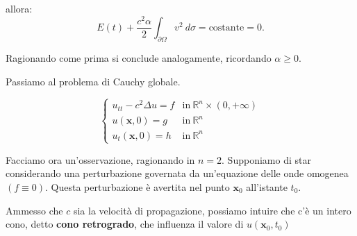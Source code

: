 \documentclass[10pt,a4paper,twoside,openright]{book}
\newcommand{\x}{\mathbf{x}}
\begin{document}
\begin{dimostrazione}
\begin{itemize}
		      allora:
		      \begin{equation*}
		      	E( t) +\frac{c^{2} \alpha }{2}\int _{\partial \Omega } v^{2} \ d\sigma =\text{costante} =0.
		      \end{equation*}
		      
		      Ragionando come prima si conclude analogamente, ricordando $\alpha \geqslant 0$.
	\end{itemize}
\end{dimostrazione}


Passiamo al problema di Cauchy globale.

\begin{equation}
	\begin{cases}
		u_{tt} -c^{2} \Delta u=f & \text{in} \ \mathbb{R}^{n} \times ( 0,+\infty ) \\
		u(\x ,0) =g      & \text{in} \ \mathbb{R}^{n}                      \\
		u_{t}(\x ,0) =h  & \text{in} \ \mathbb{R}^{n}                      
	\end{cases}
	\label{eq:pcg-onde-unicita}
\end{equation}

Facciamo ora un'osservazione, ragionando in $n=2$. Supponiamo di star considerando una perturbazione governata da un'equazione delle onde omogenea $( f\equiv 0)$. Questa perturbazione è avertita nel punto $\x_{0}$ all'istante $t_{0}$.

Ammesso che $c$ sia la velocità di propagazione, possiamo intuire che c'è un intero cono, detto \textbf{cono retrogrado}, che influenza il valore di $u(\x_{0} ,t_{0})$

\end{document}
